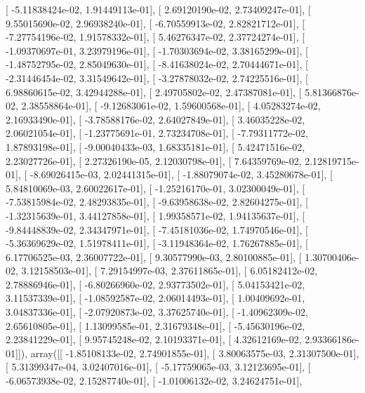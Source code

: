 \documentclass{article}
\begin{document}
       [ -5.11838424e-02,   1.91449113e-01],
       [  2.69120190e-02,   2.73409247e-01],
       [  9.55015690e-02,   2.96938240e-01],
       [ -6.70559913e-02,   2.82821712e-01],
       [ -7.27754196e-02,   1.91578332e-01],
       [  5.46276347e-02,   2.37724274e-01],
       [ -1.09370697e-01,   3.23979196e-01],
       [ -1.70303694e-02,   3.38165299e-01],
       [ -1.48752795e-02,   2.85049630e-01],
       [ -8.41638024e-02,   2.70444671e-01],
       [ -2.31446454e-02,   3.31549642e-01],
       [ -3.27878032e-02,   2.74225516e-01],
       [  6.98860615e-02,   3.42944288e-01],
       [  2.49705802e-02,   2.47387081e-01],
       [  5.81366876e-02,   2.38558864e-01],
       [ -9.12683061e-02,   1.59600568e-01],
       [  4.05283274e-02,   2.16933490e-01],
       [ -3.78588176e-02,   2.64027849e-01],
       [  3.46035228e-02,   2.06021054e-01],
       [ -1.23775691e-01,   2.73234708e-01],
       [ -7.79311772e-02,   1.87893198e-01],
       [ -9.00040433e-03,   1.68335181e-01],
       [  5.42471516e-02,   2.23027726e-01],
       [  2.27326190e-05,   2.12030798e-01],
       [  7.64359769e-02,   2.12819715e-01],
       [ -8.69026415e-03,   2.02441315e-01],
       [ -1.88079074e-02,   3.45280678e-01],
       [  5.84810069e-03,   2.60022617e-01],
       [ -1.25216170e-01,   3.02300049e-01],
       [ -7.53815984e-02,   2.48293835e-01],
       [ -9.63958638e-02,   2.82604275e-01],
       [ -1.32315639e-01,   3.44127858e-01],
       [  1.99358571e-02,   1.94135637e-01],
       [ -9.84448839e-02,   2.34347971e-01],
       [ -7.45181036e-02,   1.74970546e-01],
       [ -5.36369629e-02,   1.51978411e-01],
       [ -3.11948364e-02,   1.76267885e-01],
       [  6.17706525e-03,   2.36007722e-01],
       [  9.30577990e-03,   2.80100885e-01],
       [  1.30700406e-02,   3.12158503e-01],
       [  7.29154997e-03,   2.37611865e-01],
       [  6.05182412e-02,   2.78886946e-01],
       [ -6.80266960e-02,   2.93773502e-01],
       [  5.04153421e-02,   3.11537339e-01],
       [ -1.08592587e-02,   2.06014493e-01],
       [  1.00409692e-01,   3.04837336e-01],
       [ -2.07920873e-02,   3.37625740e-01],
       [ -1.40962309e-02,   2.65610805e-01],
       [  1.13099585e-01,   2.31679348e-01],
       [ -5.45630196e-02,   2.23841229e-01],
       [  9.95745248e-02,   2.10193371e-01],
       [  4.32612169e-02,   2.93366186e-01]]), array([[ -1.85108133e-02,   2.74901855e-01],
       [  3.80063575e-03,   2.31307500e-01],
       [  5.31399347e-04,   3.02407016e-01],
       [ -5.17759065e-03,   3.12123695e-01],
       [ -6.06573938e-02,   2.15287740e-01],
       [ -1.01006132e-02,   3.24624751e-01],
\end{document}
